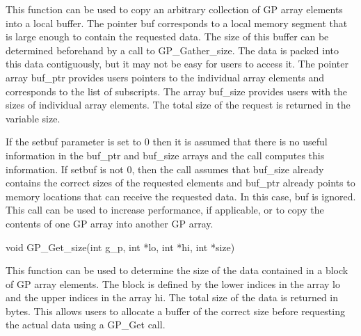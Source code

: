 \documentclass[12pt]{article}
\begin{document}
\begin{desc}

This function can be used to copy an arbitrary collection of GP array elements
into a local buffer. The pointer buf corresponds to a local memory segment that
is large enough to contain the requested data. The size of this buffer can be
determined beforehand by a call to GP\_Gather\_size. The data is packed into
this data contiguously, but it may not be easy for users to access it. The
pointer array buf\_ptr provides users pointers to the individual array elements
and corresponds to the list of subscripts. The array buf\_size provides users
with the sizes of individual array elements. The total size of the request is
returned in the variable size.

If the setbuf parameter is set to 0
then it is assumed that there is no useful information in the buf\_ptr and
buf\_size arrays and the call computes this information. If setbuf is not 0,
then the call assumes that buf\_size already contains the correct sizes of the
requested elements and buf\_ptr already points to memory locations that can
receive the requested data. In this case, buf is ignored. This call can be used
to increase performance, if applicable, or to copy the contents of one GP array
into another GP array.

\end{desc}



\begin{capi}
\begin{ccode}
void GP_Get_size(int g_p, int *lo, int *hi, int *size)
\end{ccode}
\begin{funcargs}
\end{funcargs}
\end{capi}

\ncoll

\begin{desc}

This function can be used to determine the size of the data contained in a block
of GP array elements. The block is defined by the lower indices in the array lo
and the upper indices in the array hi. The total size of the data is returned in
bytes. This allows users to allocate a buffer of the correct size before
requesting the actual data using a GP\_Get call.

\end{desc}
\end{document}

